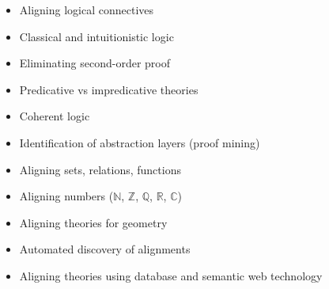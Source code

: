 \begin{workpackage}[id=alignment,wphases=0-48,type=RTD,
  short=Concept Alignment,%
  title=Concept Alignment,
  lead=Lee,
  LeeRM=72,
  LmuRM=36,
  StrRM=28,
  BelRM=18,
  ImtRM=22,
  InnRM=6,
  LriRM=15,
  FauRM=18,
  BolRM=14,
  InrRM=7
  ]

\begin{wpobjectives}
\end{wpobjectives}

\begin{wpdescription}
\end{wpdescription}

\begin{tasklist}
  \begin{task}[id=alignlogic,title=Alignment of logical foundations,lead=Lee]
    \begin{itemize}
    \item Aligning logical connectives
    \item Classical and intuitionistic logic
    \item Eliminating second-order proof
    \item Predicative vs impredicative theories
    \item Coherent logic
    \item Identification of abstraction layers (proof mining)
    \end{itemize}
  \end{task}
  
  \begin{task}[id=aligncasestudies,title=Case studies,lead=Str]
    \begin{itemize}
    \item Aligning sets, relations, functions
    \item Aligning numbers ($\mathbb{N}$, $\mathbb{Z}$, $\mathbb{Q}$,
      $\mathbb{R}$, $\mathbb{C}$)
    \item Aligning theories for geometry
    \end{itemize}
  \end{task}

  \begin{task}[id=aligntheories,title=Automated theory alignment,lead=Inr]
    \begin{itemize}
    \item Automated discovery of alignments
    \item Aligning theories using database and semantic web technology
    \end{itemize}
  \end{task}


\end{tasklist}
\end{workpackage}
